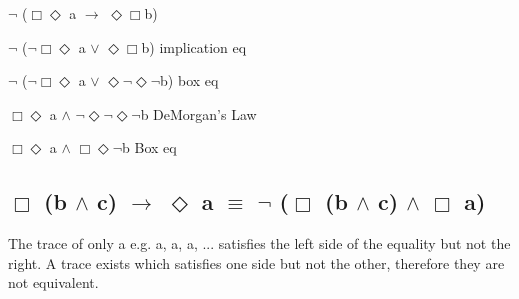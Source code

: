 \documentclass{article}
\begin{document}
$\neg$ ($\Box$$\Diamond$ a $\rightarrow$ $\Diamond$$\Box$b) 
\smallbreak

$\neg$ ($\neg$$\Box$$\Diamond$ a $\lor$ $\Diamond$$\Box$b) \hfill implication eq
\smallbreak

$\neg$ ($\neg$$\Box$$\Diamond$ a $\lor$ $\Diamond$$\neg$$\Diamond$$\neg$b) \hfill box eq
\smallbreak

$\Box$$\Diamond$ a $\land$ $\neg$$\Diamond$$\neg$$\Diamond$$\neg$b \hfill DeMorgan's Law
\smallbreak

$\Box$$\Diamond$ a $\land$ $\Box$$\Diamond$$\neg$b \hfill Box eq

\subsection{$\Box$ (b $\land$ c) $\rightarrow$ $\Diamond$ a $\equiv$ $\neg$ ($\Box$ (b $\land$ c) $\land$ $\Box$ a) }

The trace of only a e.g. {a, a, a, ...} satisfies the left side of the equality but not the right. A trace exists which satisfies one side but not the other, therefore they are not equivalent.    
\end{document}
